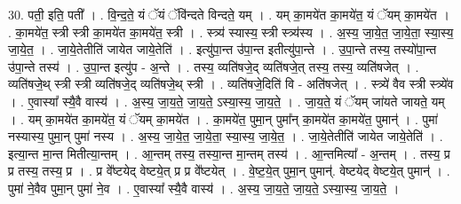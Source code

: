 \documentclass[17pt]{extarticle}
\begin{document}
30. पती॒ इति॒ पती᳚ । . वि॒न्द॒ते॒ यं ॅयं ॅवि॑न्दते विन्दते॒ यम् । . यम् का॒मये॑त का॒मये॑त॒ यं ॅयम् का॒मये॑त । . का॒मये॑त॒ स्त्री स्त्री का॒मये॑त का॒मये॑त॒ स्त्री । . स्त्र्य॑ स्यास्य॒ स्त्री स्त्र्य॑स्य । . अ॒स्य॒ जा॒ये॒त॒ जा॒ये॒ता॒ स्या॒स्य॒ जा॒ये॒त॒ । . जा॒ये॒तेतीति॑ जायेत जाये॒तेति॑ । . इत्यु॑पा॒न्त उ॑पा॒न्त इतीत्यु॑पा॒न्ते । . उ॒पा॒न्ते तस्य॒ तस्यो॑पा॒न्त उ॑पा॒न्ते तस्य॑ । . उ॒पा॒न्त इत्यु॑प - अ॒न्ते । . तस्य॒ व्यति॑षजे॒द् व्यति॑षजे॒त् तस्य॒ तस्य॒ व्यति॑षजेत् । . व्यति॑षजे॒थ् स्त्री स्त्री व्यति॑षजे॒द् व्यति॑षजे॒थ् स्त्री । . व्यति॑षजे॒दिति॑ वि - अति॑षजेत् । . स्त्र्ये॑ वैव स्त्री स्त्र्ये॑व । . ए॒वास्या᳚ स्यै॒वै वास्य॑ । . अ॒स्य॒ जा॒य॒ते॒ जा॒य॒ते॒ ऽस्या॒स्य॒ जा॒य॒ते॒ । . जा॒य॒ते॒ यं ॅयम् जा॑यते जायते॒ यम् । . यम् का॒मये॑त का॒मये॑त॒ यं ॅयम् का॒मये॑त । . का॒मये॑त॒ पुमा॒न् पुमा᳚न् का॒मये॑त का॒मये॑त॒ पुमान्॑ । . पुमा॑ नस्यास्य॒ पुमा॒न् पुमा॑ नस्य । . अ॒स्य॒ जा॒ये॒त॒ जा॒ये॒ता॒ स्या॒स्य॒ जा॒ये॒त॒ । . जा॒ये॒तेतीति॑ जायेत जाये॒तेति॑ । . इत्या॒न्त मा॒न्त मितीत्या॒न्तम् । . आ॒न्तम् तस्य॒ तस्या॒न्त मा॒न्तम् तस्य॑ । . आ॒न्तमित्या᳚ - अ॒न्तम् । . तस्य॒ प्र प्र तस्य॒ तस्य॒ प्र । . प्र वे᳚ष्टयेद् वेष्टये॒त् प्र प्र वे᳚ष्टयेत् । . वे॒ष्ट॒ये॒त् पुमा॒न् पुमान्॑. वेष्टयेद् वेष्टये॒त् पुमान्॑ । . पुमा॑ ने॒वैव पुमा॒न् पुमा॑ ने॒व । . ए॒वास्या᳚ स्यै॒वै वास्य॑ । . अ॒स्य॒ जा॒य॒ते॒ जा॒य॒ते॒ ऽस्या॒स्य॒ जा॒य॒ते॒ । \newline
\end{document}
